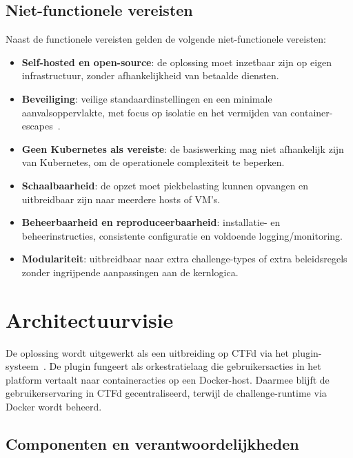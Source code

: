 \subsection{Niet-functionele vereisten}

Naast de functionele vereisten gelden de volgende niet-functionele vereisten:

\begin{itemize}
  \item \textbf{Self-hosted en open-source}: de oplossing moet inzetbaar zijn op eigen infrastructuur, zonder afhankelijkheid van betaalde diensten.
  \item \textbf{Beveiliging}: veilige standaardinstellingen en een minimale aanvalsoppervlakte, met focus op isolatie en het vermijden van container-escapes~\autocite{OWASP2024,CISDocker}.
  \item \textbf{Geen Kubernetes als vereiste}: de basiswerking mag niet afhankelijk zijn van Kubernetes, om de operationele complexiteit te beperken.
  \item \textbf{Schaalbaarheid}: de opzet moet piekbelasting kunnen opvangen en uitbreidbaar zijn naar meerdere hosts of VM's.
  \item \textbf{Beheerbaarheid en reproduceerbaarheid}: installatie- en beheerinstructies, consistente configuratie en voldoende logging/monitoring.
  \item \textbf{Modulariteit}: uitbreidbaar naar extra challenge-types of extra beleidsregels zonder ingrijpende aanpassingen aan de kernlogica.
\end{itemize}

\section{Architectuurvisie}%
\label{sec:tobe-architectuur}

De oplossing wordt uitgewerkt als een uitbreiding op CTFd via het plugin-systeem~\autocite{CTFdGitHub,CTFdPlugins}. De plugin fungeert als orkestratielaag die gebruikersacties in het platform vertaalt naar containeracties op een Docker-host. Daarmee blijft de gebruikerservaring in CTFd gecentraliseerd, terwijl de challenge-runtime via Docker wordt beheerd.

\subsection{Componenten en verantwoordelijkheden}

